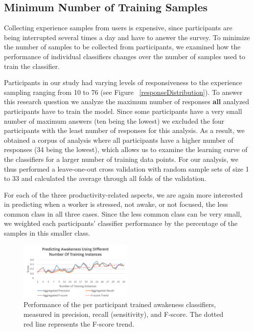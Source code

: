 
\subsection{Minimum Number of Training Samples}\label{secLearningCurve}
Collecting experience samples from users is expensive, since participants 
are being interrupted several times a day and have to answer the survey. 
To minimize the number of samples to be collected from participants, we 
examined how the performance of individual classifiers changes over the 
number of samples used to train the classifier.

Participants in our study had varying levels of responsiveness to the 
experience sampling ranging from 10 to 76 (see Figure~
\ref{responseDistribution}).
To answer this research question we analyze the maximum number of responses \textbf{all} analyzed participants have to train the model. Since some participants have a very small number of maximum answers (ten being the lowest) we excluded the four participants with the least number of responses for this analysis.
As a result, we obtained a corpus of analysis where all participants have a 
higher number of responses (34 being the lowest), which allows us to examine 
the learning curve of the classifiers for a larger number of training data points. For our 
analysis, we thus performed a leave-one-out cross validation with random 
sample sets of size 1 to 33 and calculated the average through all folds of 
the validation.

For each of the three productivity-related aspects, we are again more 
interested in predicting when a worker is stressed, not awake, or not 
focused, the less common class in all three cases. Since the less common 
class can be very small, we weighted each participants' classifier 
performance by the percentage of the samples in this smaller class.


\begin{figure}
  \centering
          \includegraphics[width=0.5\textwidth]{20180912AwakenessLC2.png}
  \caption{Performance of the per participant trained awakeness classifiers, measured in precision, recall (sensitivity), and F-score. The dotted red line represents the F-score trend.}\label{fig:learningCurveInd}
  \vspace*{-3mm}
\end{figure}

